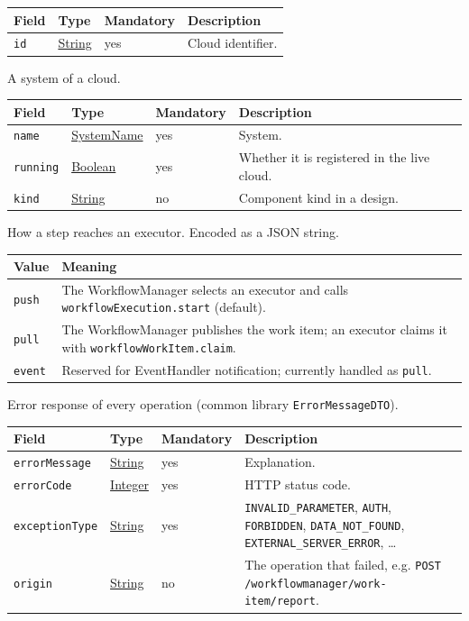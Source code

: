 \documentclass[a4paper]{arrowhead}
\newcommand{\pref}[1]{{\textcolor{ArrowheadGrey}{\hyperref[sec:model:primitives:#1]{#1}}}}
\begin{document}
{\small
\begin{longtable}{|p{3.7cm}|p{4.2cm}|p{1.6cm}|p{6.3cm}|}

\hline
\rowcolor{gray!33} Field & Type & Mandatory & Description \\ \hline
\endhead
\texttt{id} & \pref{String} & yes & Cloud identifier. \\ \hline
\end{longtable}
}

A system of a cloud.

{\small
\begin{longtable}{|p{3.7cm}|p{4.2cm}|p{1.6cm}|p{6.3cm}|}

\hline
\rowcolor{gray!33} Field & Type & Mandatory & Description \\ \hline
\endhead
\texttt{name} & \pref{SystemName} & yes & System. \\ \hline
\texttt{running} & \pref{Boolean} & yes & Whether it is registered in the live cloud. \\ \hline
\texttt{kind} & \pref{String} & no & Component kind in a design. \\ \hline
\end{longtable}
}

How a step reaches an executor.
 Encoded as a JSON string.
{\small
\begin{longtable}{|p{3.9cm}|p{11.9cm}|}

\hline
\rowcolor{gray!33} Value & Meaning \\ \hline
\endhead
\texttt{push} & The WorkflowManager selects an executor and calls \texttt{workflowExecution.start} (default). \\ \hline
\texttt{pull} & The WorkflowManager publishes the work item; an executor claims it with \texttt{workflowWorkItem.claim}. \\ \hline
\texttt{event} & Reserved for EventHandler notification; currently handled as \texttt{pull}. \\ \hline
\end{longtable}
}

Error response of every operation (common library \texttt{ErrorMessageDTO}).

{\small
\begin{longtable}{|p{3.7cm}|p{4.2cm}|p{1.6cm}|p{6.3cm}|}

\hline
\rowcolor{gray!33} Field & Type & Mandatory & Description \\ \hline
\endhead
\texttt{errorMessage} & \pref{String} & yes & Explanation. \\ \hline
\texttt{errorCode} & \pref{Integer} & yes & HTTP status code. \\ \hline
\texttt{exceptionType} & \pref{String} & yes & \texttt{INVALID\_PARAMETER}, \texttt{AUTH}, \texttt{FORBIDDEN}, \texttt{DATA\_NOT\_FOUND}, \texttt{EXTERNAL\_SERVER\_ERROR}, \ldots \\ \hline
\texttt{origin} & \pref{String} & no & The operation that failed, e.g. \texttt{POST /workflowmanager/work-item/report}. \\ \hline
\end{longtable}
}
\end{document}
